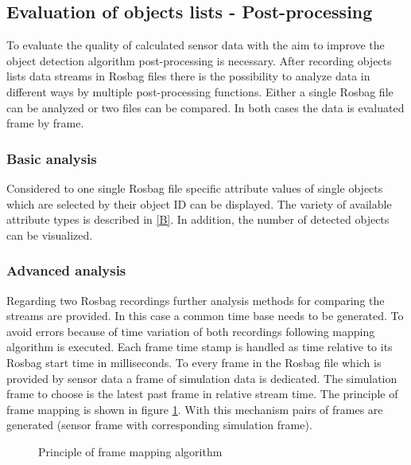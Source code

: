 \subsection{Evaluation of objects lists - Post-processing}
To evaluate the quality of calculated sensor data with the aim to improve the object detection algorithm post-processing is necessary.
After recording objects lists data streams in Rosbag files there is the possibility to analyze data in different ways by multiple post-processing functions. 
Either a single Rosbag file can be analyzed or two files can be compared. In both cases the data is evaluated frame by frame. 

\subsubsection{Basic analysis}

Considered to one single Rosbag file specific attribute values of single objects which are selected by their object \ac{ID} can be displayed. The variety of available attribute types is described in \cref{B}. In addition, the number of detected objects can be visualized. \\

\subsubsection{Advanced analysis}
\label{sssec:eval}

Regarding two Rosbag recordings further analysis methods for comparing the streams are provided. In this case a common time base needs to be generated. To avoid errors because of time variation of both recordings following mapping algorithm is executed. Each frame time stamp is handled as time relative to its Rosbag start time in milliseconds. To every frame in the Rosbag file which is provided by sensor data a frame of simulation data is dedicated. The simulation frame to choose is the latest past frame in relative stream time. The principle of frame mapping is shown in figure \ref{fig:frame_mapping}. With this mechanism pairs of frames are generated (sensor frame with corresponding simulation frame).

\begin{figure}[t]
	\centering
	\caption{Principle of frame mapping algorithm}
	\label{fig:frame_mapping}
\end{figure}


